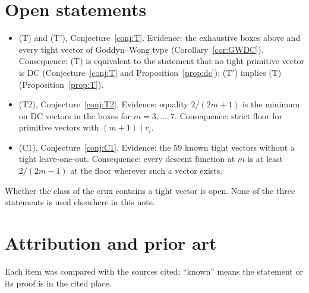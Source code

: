 \documentclass[11pt]{article}
\theoremstyle{remark}
\begin{document}
\section{Open statements}\label{sec:open}

\begin{itemize}
\item (T) and (T$'$), Conjecture~\ref{conj:T}. Evidence: the exhaustive boxes above and every tight vector of Goddyn--Wong type (Corollary~\ref{cor:GWDC}). Consequence: (T) is equivalent to the statement that no tight primitive vector is DC (Conjecture~\ref{conj:T} and Proposition~\ref{prop:dc}); (T$'$) implies (T) (Proposition~\ref{prop:T}).
\item (T2), Conjecture~\ref{conj:T2}. Evidence: equality $2/(2m+1)$ is the minimum on DC vectors in the boxes for $m=3,\dots,7$. Consequence: strict floor for primitive vectors with $(m+1)\mid v_i$.
\item (C1), Conjecture~\ref{conj:C1}. Evidence: the $59$ known tight vectors without a tight leave-one-out. Consequence: every descent function at $m$ is at least $2/(2m-1)$ at the floor wherever such a vector exists.
\end{itemize}
Whether the class of the crux contains a tight vector is open. None of the three statements is used elsewhere in this note.

\section{Attribution and prior art}\label{sec:attr}

Each item was compared with the sources cited; ``known'' means the statement or its proof is in the cited place.
\end{document}
